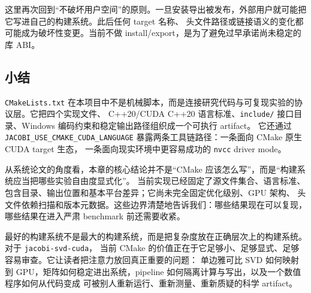 这里再次回到“不破坏用户空间”的原则。一旦安装导出被发布，外部用户就可能把它写进自己的构建系统。此后任何 target 名称、
头文件路径或链接语义的变化都可能成为破坏性变更。当前不做 install/export，是为了避免过早承诺尚未稳定的库 ABI。

\subsection{小结}

\texttt{CMakeLists.txt} 在本项目中不是机械脚本，而是连接研究代码与可复现实验的协议层。它把四个实现文件、
C++20/CUDA C++20 语言标准、\texttt{include/} 接口目录、Windows 编码约束和稳定输出路径组织成一个可执行 artifact。
它还通过 \texttt{JACOBI\_USE\_CMAKE\_CUDA\_LANGUAGE} 暴露两条工具链路径：一条面向 CMake 原生 CUDA target 生态，
一条面向现实环境中更容易成功的 \texttt{nvcc} driver mode。

从系统论文的角度看，本章的核心结论并不是“CMake 应该怎么写”，而是“构建系统应当把哪些实验自由度显式化”。
当前实现已经固定了源文件集合、语言标准、包含目录、输出位置和基本平台差异；它尚未完全固定优化级别、GPU 架构、
头文件依赖扫描和版本元数据。这些边界清楚地告诉我们：哪些结果现在可以复现，哪些结果在进入严肃 benchmark 前还需要收紧。

最好的构建系统不是最大的构建系统，而是把复杂度放在正确层次上的构建系统。对于 \texttt{jacobi-svd-cuda}，
当前 CMake 的价值正在于它足够小、足够显式、足够容易审查。它让读者把注意力放回真正重要的问题：
单边雅可比 SVD 如何映射到 GPU，矩阵如何稳定进出系统，pipeline 如何隔离计算与写出，以及一个数值程序如何从代码变成
可被别人重新运行、重新测量、重新质疑的科学 artifact。
